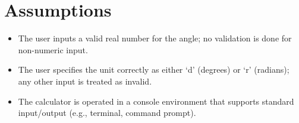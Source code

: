 \documentclass[11pt,a4paper,twoside]{article}
\begin{document}
\section*{Assumptions}
\begin{itemize}
\item The user inputs a valid real number for the angle; no validation is done for non-numeric input.
\item The user specifies the unit correctly as either ‘d’ (degrees) or ‘r’ (radians); any other input is treated as invalid.
\item The calculator is operated in a console environment that supports standard input/output (e.g., terminal, command prompt).
\end{itemize}
\end{document}

